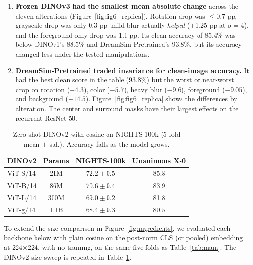 \begin{enumerate}[leftmargin=*,itemsep=1pt,topsep=1pt]
\item \textbf{Frozen DINOv3 had the smallest mean absolute change} across the eleven alterations (Figure~\ref{fig:fig6_replica}). Rotation drop was $\leq 0.7$ pp, grayscale drop was only 0.3 pp, mild blur actually \emph{helped} (+1.25 pp at $\sigma=4$), and the foreground-only drop was 1.1 pp. Its clean accuracy of 85.4\% was below DINOv1's 88.5\% and DreamSim-Pretrained's 93.8\%, but its accuracy changed less under the tested manipulations.
\item \textbf{DreamSim-Pretrained traded invariance for clean-image accuracy.} It had the best clean score in the table ($93.8\%$) but the worst or near-worst drop on rotation ($-4.3$), color ($-5.7$), heavy blur ($-9.6$), foreground ($-9.05$), and background ($-14.5$). Figure~\ref{fig:fig6_replica} shows the differences by alteration. The center and surround masks have their largest effects on the recurrent ResNet-50.
\end{enumerate}

\begin{table}[!ht]
\caption{Zero-shot DINOv2 with cosine on NIGHTS-100k (5-fold mean $\pm$ s.d.). Accuracy falls as the model grows.}
\label{tab:scale}
\centering
\small
\begin{tabular}{lccc}
\toprule
DINOv2 & Params & NIGHTS-100k & Unanimous X-0 \\
\midrule
ViT-S/14 & 21M  & $72.2 \pm 0.5$ & 85.8 \\
ViT-B/14 & 86M  & $70.6 \pm 0.4$ & 83.9 \\
ViT-L/14 & 300M & $69.0 \pm 0.2$ & 81.8 \\
ViT-g/14 & 1.1B & $68.4 \pm 0.3$ & 80.5 \\
\bottomrule
\end{tabular}
\end{table}

\clearpage
{}
\vspace{1em}

To extend the size comparison in Figure~\ref{fig:ingredients}, we evaluated each backbone below with plain cosine on the post-norm CLS (or pooled) embedding at 224$\times$224, with no training, on the same five folds as Table~\ref{tab:main}. The DINOv2 size sweep is repeated in Table~\ref{tab:scale}.

